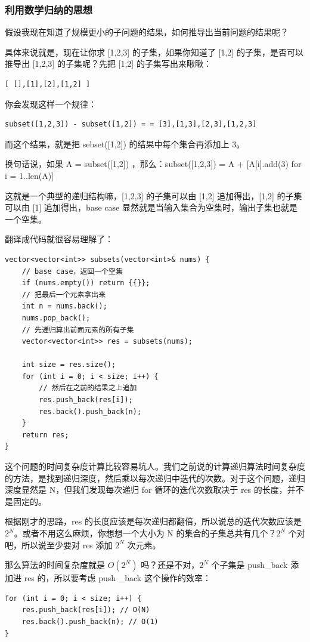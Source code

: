 \documentclass[12pt]{article}
\begin{document}
\subsubsection{利用数学归纳的思想}
假设我现在知道了规模更小的子问题的结果，如何推导出当前问题的结果呢？

具体来说就是，现在让你求 [1,2,3] 的子集，如果你知道了 [1,2] 的子集，是否可以推导出 [1,2,3] 的子集呢？先把 [1,2] 的子集写出来瞅瞅：
\begin{lstlisting}
[ [],[1],[2],[1,2] ]
\end{lstlisting}

你会发现这样一个规律：
\begin{lstlisting}
subset([1,2,3]) - subset([1,2]) = = [3],[1,3],[2,3],[1,2,3]
\end{lstlisting}

而这个结果，就是把 sebset([1,2]) 的结果中每个集合再添加上 3。

换句话说，如果 A = subset([1,2]) ，那么：subset([1,2,3]) = A + [A[i].add(3) for i = 1..len(A)]

这就是一个典型的递归结构嘛，[1,2,3] 的子集可以由 [1,2] 追加得出，[1,2] 的子集可以由 [1] 追加得出，base case 显然就是当输入集合为空集时，输出子集也就是一个空集。

翻译成代码就很容易理解了：
\begin{lstlisting}
vector<vector<int>> subsets(vector<int>& nums) {
    // base case，返回一个空集
    if (nums.empty()) return {{}};
    // 把最后一个元素拿出来
    int n = nums.back();
    nums.pop_back();
    // 先递归算出前面元素的所有子集
    vector<vector<int>> res = subsets(nums);

    int size = res.size();
    for (int i = 0; i < size; i++) {
        // 然后在之前的结果之上追加
        res.push_back(res[i]);
        res.back().push_back(n);
    }
    return res;
}
\end{lstlisting}

这个问题的时间复杂度计算比较容易坑人。我们之前说的计算递归算法时间复杂度的方法，是找到递归深度，然后乘以每次递归中迭代的次数。对于这个问题，递归深度显然是 N，但我们发现每次递归 for 循环的迭代次数取决于 res 的长度，并不是固定的。

根据刚才的思路，res 的长度应该是每次递归都翻倍，所以说总的迭代次数应该是 $2^N$。或者不用这么麻烦，你想想一个大小为 N 的集合的子集总共有几个？$2^N$ 个对吧，所以说至少要对 res 添加 $2^N$ 次元素。

那么算法的时间复杂度就是 $O(2^N)$ 吗？还是不对，$2^N$ 个子集是 push\_back 添加进 res 的，所以要考虑 push
\_back 这个操作的效率：
\begin{lstlisting}
for (int i = 0; i < size; i++) {
    res.push_back(res[i]); // O(N)
    res.back().push_back(n); // O(1)
}
\end{lstlisting}
\end{document}
